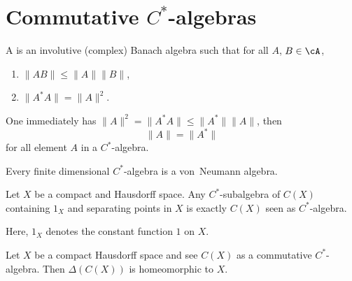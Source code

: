 \section{Commutative \texorpdfstring{$C^*$}{C}-algebras}

\begin{definition}
    A  is an involutive (complex) Banach algebra such that for all $A$, $B\in\cA$,
    \begin{enumerate}
        \item $\|AB\|\leq\|A\|\|B\|$,
        \item $\|A^*A\|=\|A\|^2$.
    \end{enumerate}
    One immediately has $\|A\|^2=\|A^*A\|\leq\|A^*\|\|A\|$, then
    \begin{equation}
        \|A\|=\|A^*\|
    \end{equation}
    for all element $A$ in a $C^*$-algebra.
\end{definition}

\begin{lemma}       \label{LemFiniCSestVNa}
    Every finite dimensional $C^*$-algebra is a von~Neumann algebra.
\end{lemma}

\begin{lemma}
Let $X$ be a compact and Hausdorff space. Any $C^*$-subalgebra of $C(X)$ containing $1_X$ and separating points in $X$ is exactly $C(X)$ seen as $C^*$-algebra.
\end{lemma}\label{lem:Stone_W}
Here, $1_X$ denotes the constant function $1$ on $X$.

\begin{proposition}     \label{PropcomCstarDelCeqX}
Let $X$ be a compact Hausdorff space and see $C(X)$ as a commutative $C^*$-algebra. Then $\Delta(C(X))$ is homeomorphic to $X$.\label{prop:comHauffhomeo}
\end{proposition}


